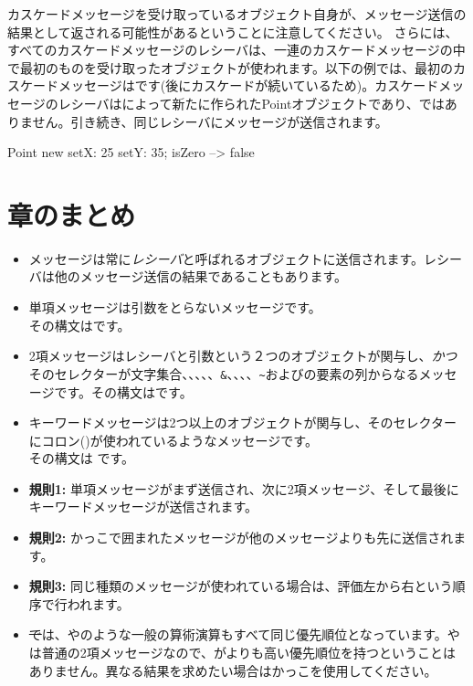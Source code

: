 \documentclass[a4paper,10pt,twoside]{book}
\begin{document}
カスケードメッセージを受け取っているオブジェクト自身が、メッセージ送信の結果として返される可能性があるということに注意してください。
さらには、すべてのカスケードメッセージのレシーバは、一連のカスケードメッセージの中で最初のものを受け取ったオブジェクトが使われます。以下の例では、最初のカスケードメッセージはです(後にカスケードが続いているため)。カスケードメッセージのレシーバはによって新たに作られたPointオブジェクトであり、ではありません。引き続き、同じレシーバにメッセージが送信されます。

\begin{code}{}
Point new setX: 25 setY: 35; isZero --> false
\end{code}

\section{章のまとめ}

\begin{itemize}
\item メッセージは常に\emph{レシーバ}と呼ばれるオブジェクトに送信されます。レシーバは他のメッセージ送信の結果であることもあります。

\item 単項メッセージは引数をとらないメッセージです。\\
その構文はです。

\item 2項メッセージはレシーバと引数という２つのオブジェクトが関与し、\emph{かつ}そのセレクターが文字集合\ct{+}、\ct{-}、\ct{*}、\ct{/}、\ct{|}、\texttt{\&}、\ct{=}、\ct{>}、\ct{<}、\texttt{\~}およびの要素の列からなるメッセージです。その構文はです。

\item キーワードメッセージは2つ以上のオブジェクトが関与し、そのセレクターにコロン(\ct{:})が使われているようなメッセージです。\\
その構文は
です。

\item \textbf{規則1:} 単項メッセージがまず送信され、次に2項メッセージ、そして最後にキーワードメッセージが送信されます。
\item \textbf{規則2:} かっこで囲まれたメッセージが他のメッセージよりも先に送信されます。
\item \textbf{規則3:} 同じ種類のメッセージが使われている場合は、評価左から右という順序で行われます。
\item \st では、\ct{+}や\ct{*}のような一般の算術演算もすべて同じ優先順位となっています。\ct{+}や\ct{*}は普通の2項メッセージなので、\ct{*}が\ct{+}よりも高い優先順位を持つということはありません。異なる結果を求めたい場合はかっこを使用してください。
\end{itemize}

\ifx\wholebook\relax\else
\end{document}
